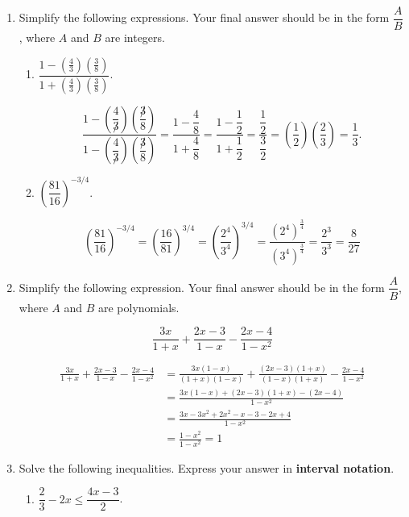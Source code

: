 \documentclass[12pt]{article}
\newcommand{\points}[1]{\marginpar{\hspace{24pt}[#1]}}
\begin{document}
\begin{enumerate}
\item Simplify the following expressions. Your final answer should be in the form $\dfrac{A}{B}$, where $A$ and $B$ are integers.
\begin{enumerate}
 \item $\dfrac{1-\left(\frac{4}{3}\right)\left(\frac{3}{8}\right)}{1+\left(\frac{4}{3}\right)\left(\frac{3}{8}\right)}$. \points{3}

\bigskip

\[
 \frac{1-\left(\dfrac{4}{\not 3}\right)\left(\dfrac{\not 3}{8}\right)}{1-\left(\dfrac{4}{\not 3}\right)\left(\dfrac{\not 3}{8}\right)} = \frac{1-\dfrac{4}{8}}{1+\dfrac{4}{8}} = \frac{1-\dfrac{1}{2}}{1+\dfrac{1}{2}} = \frac{\dfrac{1}{2}}{\dfrac{3}{2}} = \left(\frac{1}{2}\right)\left(\frac{2}{3}\right) = \frac{1}{3}. 
\]



\bigskip

 \item $\left(\dfrac{81}{16}\right)^{-3/4}$. \points{3}

\bigskip

\[
 \left(\frac{81}{16}\right)^{-3/4} = \left(\dfrac{16}{81}\right)^{3/4} = \left(\frac{2^4}{3^4}\right)^{3/4} = \frac{(2^4)^{\frac{3}{4}}}{(3^4)^{\frac{3}{4}}} = \frac{2^3}{3^3} = \frac{8}{27}
\]

\bigskip


\end{enumerate}
\item Simplify the following expression. Your final answer should be in the form $\dfrac{A}{B}$, where $A$ and $B$ are polynomials.\points{4} 

\[
 \frac{3x}{1+x}+\frac{2x-3}{1-x}-\frac{2x-4}{1-x^2} 
\]

\bigskip

\begin{align*}
 \frac{3x}{1+x}+\frac{2x-3}{1-x}-\frac{2x-4}{1-x^2}&= \frac{3x(1-x)}{(1+x)(1-x)}+\frac{(2x-3)(1+x)}{(1-x)(1+x)}-\frac{2x-4}{1-x^2}\\
& = \frac{3x(1-x)+(2x-3)(1+x)-(2x-4)}{1-x^2}\\
& = \frac{3x-3x^2+2x^2-x-3-2x+4}{1-x^2}\\
& = \frac{1-x^2}{1-x^2} = 1
\end{align*}


\newpage

\item Solve the following inequalities. Express your answer in {\bf interval notation}.
\begin{enumerate}
 \item $\dfrac{2}{3}-2x \leq \dfrac{4x-3}{2}$. \points{3}


\end{enumerate}
\end{enumerate}
\end{document}
